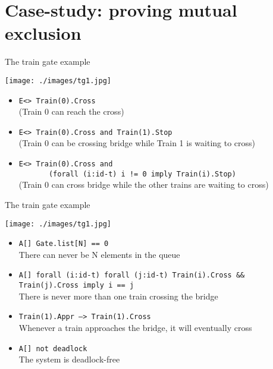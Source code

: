 \documentclass{beamer}
\def\dkb#1{{\blue #1}}
\begin{document}



\section{Case-study: proving mutual exclusion}



\begin{slide}{The train gate example}
\small

\begin{center}
\texttt{[image: ./images/tg1.jpg]} 
\end{center}

\begin{itemize}
\item \texttt{E<> Train(0).Cross} 
\\ \dkb{(Train 0 can reach the cross)}
\item \texttt{E<> Train(0).Cross and Train(1).Stop}
\\ \dkb{(Train 0 can be crossing bridge while Train 1 is waiting to cross)}
\item \texttt{E<> Train(0).Cross and}\\
  \texttt{~~~~~~~(forall (i:id-t) i != 0 imply Train(i).Stop)}
\\ \dkb{(Train 0 can cross bridge while the other trains are waiting to cross)}
\end{itemize}

\end{slide}

\begin{slide}{The train gate example}
\small

\begin{center}
\texttt{[image: ./images/tg1.jpg]} 
\end{center}


\begin{itemize}
\item \texttt{A[] Gate.list[N] == 0}
\\ \dkb{There can never be N elements in the queue}
\item \texttt{A[] forall (i:id-t) forall (j:id-t) Train(i).Cross \&\& Train(j).Cross imply i == j}
\\ \dkb{There is never more than one train crossing the bridge}
\item \texttt{Train(1).Appr --> Train(1).Cross}
\\ \dkb{Whenever a train approaches the bridge, it will eventually cross}
\item \texttt{A[] not deadlock}
\\ \dkb{The system is deadlock-free}
\end{itemize}


\end{slide}
\end{document}

